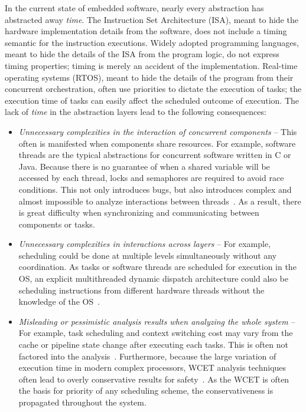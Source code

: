 In the current state of embedded software, nearly every abstraction has abstracted away \emph{time}.
The Instruction Set Architecture (ISA), meant to hide the hardware implementation details from the software, does not include a timing semantic for the instruction executions.  
Widely adopted programming languages, meant to hide the details of the ISA from the program logic, do not express timing properties; timing is merely an accident of the implementation.
Real-time operating systems (RTOS), meant to hide the details of the program from their concurrent orchestration, often use priorities to dictate the execution of tasks; the execution time of tasks can easily affect the scheduled outcome of execution.
The lack of \emph{time} in the abstraction layers lead to the following consequences:
\begin{itemize}
\item \emph{Unnecessary complexities in the interaction of concurrent components} --  
This often is manifested when components share resources. 
For example, software threads are the typical abstractions for concurrent software written in C or Java. 
Because there is no guarantee of when a shared variable will be accessed by each thread, locks and semaphores are required to avoid race conditions. 
This not only introduces bugs, but also introduces complex and almost impossible to analyze interactions between threads~\cite{leethreads}. 
As a result, there is great difficulty when synchronizing and communicating between components or tasks.

\item \emph{Unnecessary complexities in interactions across layers} -- 
For example, scheduling could be done at multiple levels simultaneously without any coordination. 
As tasks or software threads are scheduled for execution in the OS, an explicit multithreaded dynamic dispatch architecture could also be scheduling instructions from different hardware threads without the knowledge of the OS~\cite{thiele:04:predictable}.

\item \emph{Misleading or pessimistic analysis results when analyzing the whole system} -- 
For example, task scheduling and context switching cost may vary from the cache or pipeline state change after executing each tasks. 
This is often not factored into the analysis~\cite{thiele:04:predictable}. 
Furthermore, because the  large variation of execution time in modern complex processors, WCET analysis techniques often lead to overly conservative results for safety~\cite{wilhelm-survey-paper}. 
As the WCET is often the basis for priority of any scheduling scheme, the conservativeness is propagated throughout the system.
\end{itemize}


